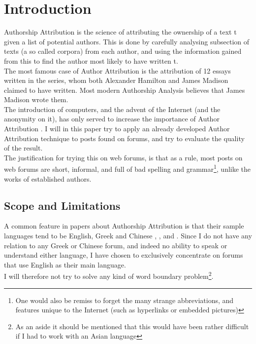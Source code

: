 \section{Introduction}
\label{introduction}
Authorship Attribution is the science of attributing the ownership of a text t given a list of potential authors. This is done by carefully analysing subsection of texts (a so called corpora) from each author, and using the information gained from this to find the author most likely to have written t.\\

The most famous case of Author Attribution is the attribution of 12 essays written in the  series, whom both Alexander Hamilton and James Madison claimed to have written. Most modern Authorship Analysis believes that James Madison wrote them.  \\
 The introduction of computers, and the advent of the Internet (and the anonymity on it), has only served to increase the importance of Author Attribution . I will in this paper try to apply an already developed Author Attribution technique to posts found on forums, and try to evaluate the quality of the result.\\

The justification for   trying this on web forums, is that as a rule, most posts on web forums are short, informal, and full of bad spelling and grammar\footnote{One would also be remiss to forget the many strange abbreviations, and features unique to the Internet (such as hyperlinks or embedded pictures)}, unlike the works of established authors. 

\subsection{Scope and Limitations}
\label{scope}
A common feature in papers about Authorship Attribution is that their sample languages tend to be English, Greek and Chinese \cite{syntactic}, \cite{nr2}, \cite{nr4} and \cite{app-spe}. Since I do not have any relation to any Greek or Chinese forum, and indeed no ability to speak or understand either language, I have chosen to exclusively concentrate on forums that use English as their main language.\\
I will therefore not try to solve any kind of word boundary problem\footnote{As an aside it should be mentioned that this would have been rather difficult if I had to work with an Asian language}.

